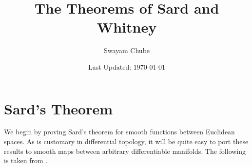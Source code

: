 \documentclass[11pt]{article}
\theoremstyle{thmstyle}
\theoremstyle{defstyle}
\begin{document}
\title{The Theorems of Sard and Whitney}
\author{Swayam Chube}
\date{Last Updated: \today}
\maketitle
\tableofcontents

\section{Sard's Theorem}

We begin by proving Sard's theorem for smooth functions between Euclidean spaces. As is customary in differential topology, it will be quite easy to port these results to smooth maps between arbitrary differentiable manifolds. The following is taken from \cite{milnor-differentiable}.
\end{document}
